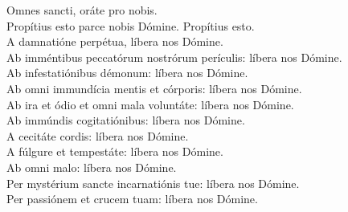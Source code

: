 {	%
		Omnes sancti, oráte pro nobis. \\
	Propítius esto parce nobis Dómine. \indent \R Propítius esto. \\
		A damnatióne perpétua, líbera nos Dómine. \\
		Ab imméntibus peccatórum nostrórum perículis: líbera nos Dómine. \\
		Ab infestatiónibus démonum: líbera nos Dómine. \\
		Ab omni immundícia mentis et córporis: líbera nos Dómine. \\
	Ab ira et ódio et omni mala voluntáte: líbera nos Dómine. \\
		Ab immúndis cogitatiónibus: líbera nos Dómine. \\
		A cecitáte cordis: líbera nos Dómine. \\
	A fúlgure et tempestáte: líbera nos Dómine. \\
	Ab omni malo: líbera nos Dómine. \\
	Per mystérium sancte incarnatiónis tue: líbera nos Dómine. \\
		Per passiónem et crucem tuam: líbera nos Dómine. \\
}
